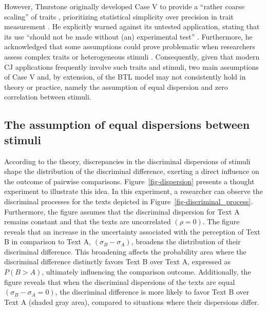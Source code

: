 \documentclass[
  authoryear,
  review,
  1p]{elsarticle}
\begin{document}
However, Thurstone originally developed Case V to provide a ``rather
coarse scaling'' of traits \citep[pp.~269]{Thurstone_1927b},
prioritizing statistical simplicity over precision in trait measurement
\citep[pp.~677]{Kelly_et_al_2022}. He explicitly warned against its
untested application, stating that its use ``should not be made without
(an) experimental test'' \citep[pp.~270]{Thurstone_1927b}. Furthermore,
he acknowledged that some assumptions could prove problematic when
researchers assess complex traits or heterogeneous stimuli
\citep[pp.~376]{Thurstone_1927a}. Consequently, given that modern CJ
applications frequently involve such traits and stimuli, two main
assumptions of Case V and, by extension, of the BTL model may not
consistently hold in theory or practice, namely the assumption of equal
dispersion and zero correlation between stimuli.

\subsection{The assumption of equal dispersions between
stimuli}\label{sec-theory-issue1a}

According to the theory, discrepancies in the discriminal dispersions of
stimuli shape the distribution of the discriminal difference, exerting a
direct influence on the outcome of pairwise comparisons.
Figure~\ref{fig-dispersion} presents a thought experiment to illustrate
this idea. In this experiment, a researcher can observe the discriminal
processes for the texts depicted in
Figure~\ref{fig-discriminal_process}. Furthermore, the figure assumes
that the discriminal dispersion for Text A remains constant and that the
texts are uncorrelated \((\rho=0)\). The figure reveals that an increase
in the uncertainty associated with the perception of Text B in
comparison to Text A, \((\sigma_{B}-\sigma_{A})\), broadens the
distribution of their discriminal difference. This broadening affects
the probability area where the discriminal difference distinctly favors
Text B over Text A, expressed as \(P(B > A)\), ultimately influencing
the comparison outcome. Additionally, the figure reveals that when the
discriminal dispersions of the texts are equal
\((\sigma_{B}-\sigma_{A}=0)\), the discriminal difference is more likely
to favor Text B over Text A (shaded gray area), compared to situations
where their dispersions differ.
\end{document}
